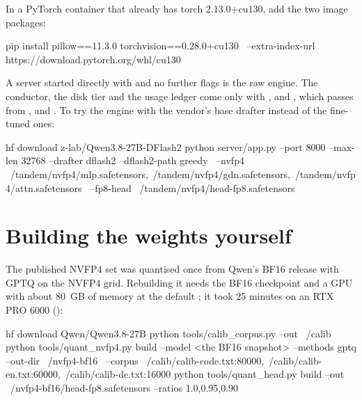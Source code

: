 In a PyTorch container that already has torch 2.13.0+cu130, add the two image packages:

\begin{shell}
pip install pillow==11.3.0 torchvision==0.28.0+cu130 \
    --extra-index-url https://download.pytorch.org/whl/cu130
\end{shell}

A server started directly with  and no further flags is the raw engine. The conductor, the disk tier and the usage ledger come only with ,  and , which  passes from ,  and . To try the engine with the vendor's base drafter instead of the fine-tuned ones:

\begin{shell}
hf download z-lab/Qwen3.8-27B-DFlash2
python server/app.py --port 8000 --max-len 32768 --drafter dflash2 --dflash2-path greedy \
    --nvfp4 ~/tandem/nvfp4/mlp.safetensors,~/tandem/nvfp4/gdn.safetensors,~/tandem/nvfp4/attn.safetensors \
    --fp8-head ~/tandem/nvfp4/head-fp8.safetensors
\end{shell}

\section{Building the weights yourself}

The published NVFP4 set was quantised once from Qwen's BF16 release with GPTQ on the NVFP4 grid. Rebuilding it needs the BF16 checkpoint and a GPU with about 80~GB of memory at the default ; it took 25 minutes on an RTX PRO 6000 (\measured):

\begin{shell}
hf download Qwen/Qwen3.8-27B
python tools/calib_corpus.py --out ~/calib
python tools/quant_nvfp4.py build --model <the BF16 snapshot> --methods gptq --out-dir ~/nvfp4-bf16 \
    --corpus ~/calib/calib-code.txt:80000,~/calib/calib-en.txt:60000,~/calib/calib-de.txt:16000
python tools/quant_head.py build --out ~/nvfp4-bf16/head-fp8.safetensors --ratios 1.0,0.95,0.90
\end{shell}

